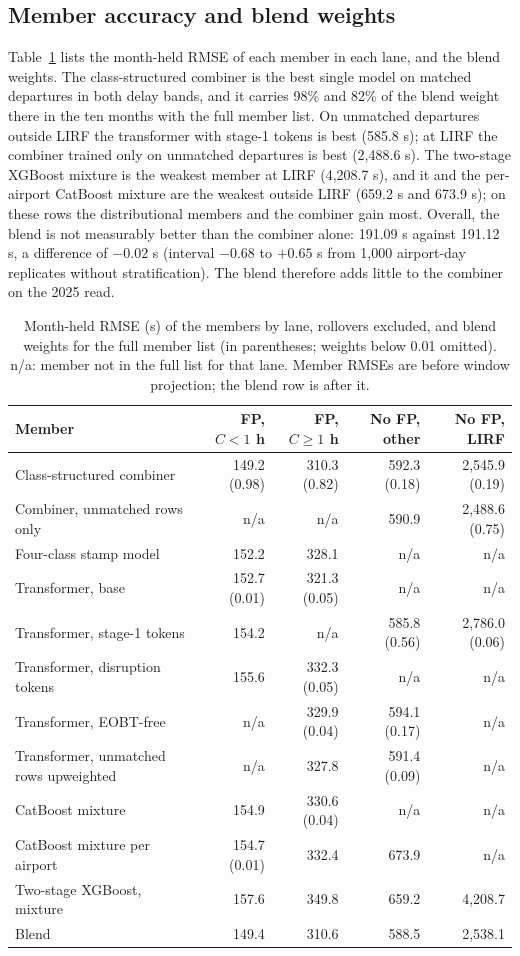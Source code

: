 \documentclass[
  manuscript=article,  %
  layout=preprint,  %
  year=20xx,
  volume=x,
]{extra/joas}
\begin{document}
\subsection{Member accuracy and blend weights}

Table~\ref{tb:members} lists the month-held RMSE of each member in each lane, and the blend weights. The class-structured combiner is the best single model on matched departures in both delay bands, and it carries 98\% and 82\% of the blend weight there in the ten months with the full member list. On unmatched departures outside LIRF the transformer with stage-1 tokens is best (585.8 s); at LIRF the combiner trained only on unmatched departures is best (2,488.6 s). The two-stage XGBoost mixture is the weakest member at LIRF (4,208.7 s), and it and the per-airport CatBoost mixture are the weakest outside LIRF (659.2 s and 673.9 s); on these rows the distributional members and the combiner gain most. Overall, the blend is not measurably better than the combiner alone: 191.09 s against 191.12 s, a difference of $-0.02$ s (interval $-0.68$ to $+0.65$ s from 1,000 airport-day replicates without stratification). The blend therefore adds little to the combiner on the 2025 read.

\begin{table}[htbp!]
  \centering
  \small
  \caption{Month-held RMSE (s) of the members by lane, rollovers excluded, and blend weights for the full member list (in parentheses; weights below 0.01 omitted). n/a: member not in the full list for that lane. Member RMSEs are before window projection; the blend row is after it.}
  \label{tb:members}
  \begin{tabular}{lrrrr}
  \toprule
  \textbf{Member} & \textbf{FP, $C<1$ h} & \textbf{FP, $C \geq 1$ h} & \textbf{No FP, other} & \textbf{No FP, LIRF} \\
  \midrule
  Class-structured combiner & 149.2 (0.98) & 310.3 (0.82) & 592.3 (0.18) & 2,545.9 (0.19) \\
  Combiner, unmatched rows only & n/a & n/a & 590.9 & 2,488.6 (0.75) \\
  Four-class stamp model & 152.2 & 328.1 & n/a & n/a \\
  Transformer, base & 152.7 (0.01) & 321.3 (0.05) & n/a & n/a \\
  Transformer, stage-1 tokens & 154.2 & n/a & 585.8 (0.56) & 2,786.0 (0.06) \\
  Transformer, disruption tokens & 155.6 & 332.3 (0.05) & n/a & n/a \\
  Transformer, EOBT-free & n/a & 329.9 (0.04) & 594.1 (0.17) & n/a \\
  Transformer, unmatched rows upweighted & n/a & 327.8 & 591.4 (0.09) & n/a \\
  CatBoost mixture & 154.9 & 330.6 (0.04) & n/a & n/a \\
  CatBoost mixture per airport & 154.7 (0.01) & 332.4 & 673.9 & n/a \\
  Two-stage XGBoost, mixture & 157.6 & 349.8 & 659.2 & 4,208.7 \\
  \midrule
  Blend & 149.4 & 310.6 & 588.5 & 2,538.1 \\
  \bottomrule
  \end{tabular}
\end{table}
\end{document}
